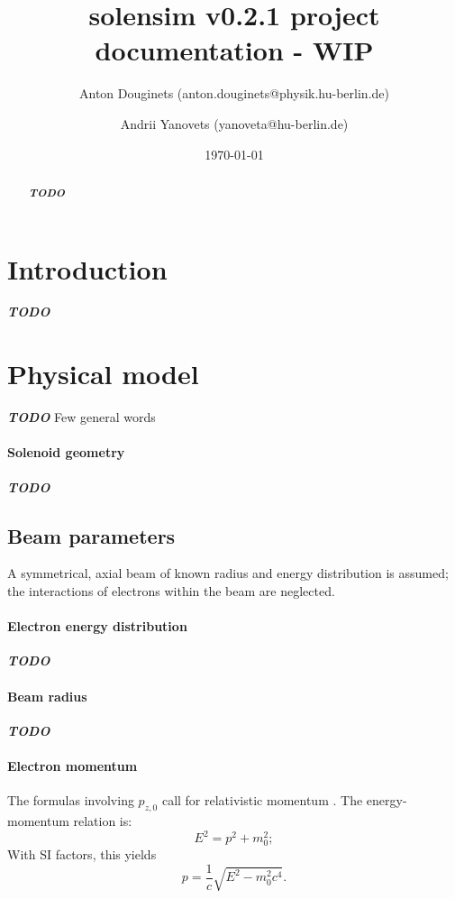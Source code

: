 \documentclass[a4paper,12pt]{article}
\title{solensim v0.2.1 project documentation - WIP}
\author{Anton Douginets (anton.douginets@physik.hu-berlin.de)
	\and
	Andrii Yanovets (yanoveta@hu-berlin.de)}
\date{\today}
\newcommand{\todo}{\textbf{\textit{TODO}} }
\begin{document}
\thispagestyle{empty}
\maketitle

\begin{abstract}
  \todo
\end{abstract}

\tableofcontents

\newpage

\section{Introduction}
  \todo


\section{Physical model}
  \todo Few general words

  \paragraph{Solenoid geometry} \todo

  \subsection{Beam parameters}
    A symmetrical, axial beam of known radius and energy distribution is assumed; the interactions of electrons within the beam are neglected.
    \paragraph{Electron energy distribution}
    \todo \cite{AREALRF}

    \paragraph{Beam radius}
    \todo \cite{Disser}

    \paragraph{Electron momentum}
    The formulas involving $p_{z,0}$ call for relativistic momentum \cite[p. 27]{Disser}. The energy-momentum relation is:
    \[
      E^2 = p^2 + m_0^2;
    \]
      With SI factors, this yields
    \begin{equation}
	     p = \frac{1}{c}\sqrt{E^2 - m_0^2c^4}.
      \end{equation}
\end{document}
